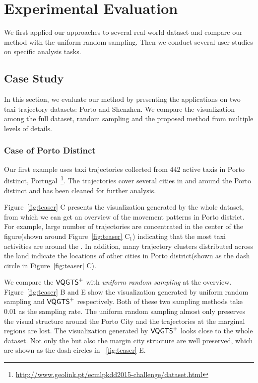 \section{Experimental Evaluation}\label{sec:exp}
We first applied our approaches to several real-world dataset and compare our method with the uniform random sampling. Then we conduct several user studies on specific analysis tasks.
\subsection{Case Study}
In this section, we evaluate our method by presenting the applications on two taxi trajectory datasets: Porto and Shenzhen. We compare the visualization among the full dataset, random sampling and the proposed method from multiple levels of details.
\subsubsection{Case of Porto Distinct}
Our first example uses taxi trajectories collected from 442 active taxis in Porto distinct, Portugal~\footnote{\url{http://www.geolink.pt/ecmlpkdd2015-challenge/dataset.html}}. The trajectories cover several cities in and around the Porto distinct and has been cleaned for further analysis.


Figure~\ref{fig:teaser} C presents the visualization generated by the whole dataset, from which we can get an overview of the movement patterns in Porto district. For example, large number of trajectories are concentrated in the center of the figure(shown around Figure~\ref{fig:teaser} C$_1$) indicating that the most taxi activities are around the . In addition,
many trajectory clusters distributed across the land indicate the locations of other cities in Porto district(shown as the dash circle in Figure~\ref{fig:teaser} C).

We compare the $\mathsf{VQGTS}^{+}$ with \textit{uniform random sampling} at the overview.
Figure~\ref{fig:teaser} B and E show the visualization generated by uniform random sampling and $\mathsf{VQGTS}^{+}$ respectively. Both of these two sampling methods take 0.01 as the sampling rate. The uniform random sampling almost only preserves the visual structure around the Porto City and the trajectories at the marginal regions are lost.
The visualization generated by $\mathsf{VQGTS}^{+}$ looks close to the whole dataset. Not only the  but also the margin city structure are well preserved, which are shown as the dash circles in ~\ref{fig:teaser} E.

